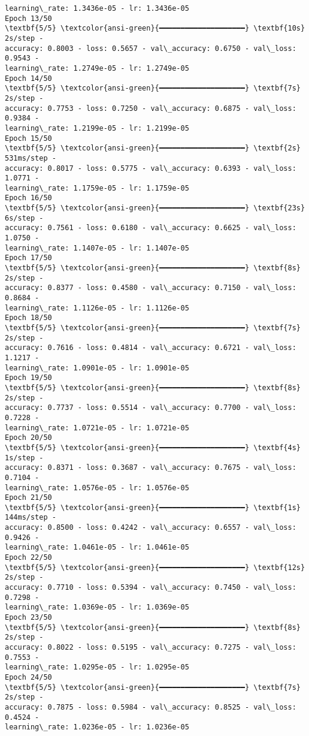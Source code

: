 \documentclass[11pt]{article}
\begin{document}
\begin{Verbatim}[commandchars=\\\{\}]
learning\_rate: 1.3436e-05 - lr: 1.3436e-05
Epoch 13/50
\textbf{5/5} \textcolor{ansi-green}{━━━━━━━━━━━━━━━━━━━━} \textbf{10s} 2s/step -
accuracy: 0.8003 - loss: 0.5657 - val\_accuracy: 0.6750 - val\_loss: 0.9543 -
learning\_rate: 1.2749e-05 - lr: 1.2749e-05
Epoch 14/50
\textbf{5/5} \textcolor{ansi-green}{━━━━━━━━━━━━━━━━━━━━} \textbf{7s} 2s/step -
accuracy: 0.7753 - loss: 0.7250 - val\_accuracy: 0.6875 - val\_loss: 0.9384 -
learning\_rate: 1.2199e-05 - lr: 1.2199e-05
Epoch 15/50
\textbf{5/5} \textcolor{ansi-green}{━━━━━━━━━━━━━━━━━━━━} \textbf{2s} 531ms/step -
accuracy: 0.8017 - loss: 0.5775 - val\_accuracy: 0.6393 - val\_loss: 1.0771 -
learning\_rate: 1.1759e-05 - lr: 1.1759e-05
Epoch 16/50
\textbf{5/5} \textcolor{ansi-green}{━━━━━━━━━━━━━━━━━━━━} \textbf{23s} 6s/step -
accuracy: 0.7561 - loss: 0.6180 - val\_accuracy: 0.6625 - val\_loss: 1.0750 -
learning\_rate: 1.1407e-05 - lr: 1.1407e-05
Epoch 17/50
\textbf{5/5} \textcolor{ansi-green}{━━━━━━━━━━━━━━━━━━━━} \textbf{8s} 2s/step -
accuracy: 0.8377 - loss: 0.4580 - val\_accuracy: 0.7150 - val\_loss: 0.8684 -
learning\_rate: 1.1126e-05 - lr: 1.1126e-05
Epoch 18/50
\textbf{5/5} \textcolor{ansi-green}{━━━━━━━━━━━━━━━━━━━━} \textbf{7s} 2s/step -
accuracy: 0.7616 - loss: 0.4814 - val\_accuracy: 0.6721 - val\_loss: 1.1217 -
learning\_rate: 1.0901e-05 - lr: 1.0901e-05
Epoch 19/50
\textbf{5/5} \textcolor{ansi-green}{━━━━━━━━━━━━━━━━━━━━} \textbf{8s} 2s/step -
accuracy: 0.7737 - loss: 0.5514 - val\_accuracy: 0.7700 - val\_loss: 0.7228 -
learning\_rate: 1.0721e-05 - lr: 1.0721e-05
Epoch 20/50
\textbf{5/5} \textcolor{ansi-green}{━━━━━━━━━━━━━━━━━━━━} \textbf{4s} 1s/step -
accuracy: 0.8371 - loss: 0.3687 - val\_accuracy: 0.7675 - val\_loss: 0.7104 -
learning\_rate: 1.0576e-05 - lr: 1.0576e-05
Epoch 21/50
\textbf{5/5} \textcolor{ansi-green}{━━━━━━━━━━━━━━━━━━━━} \textbf{1s} 144ms/step -
accuracy: 0.8500 - loss: 0.4242 - val\_accuracy: 0.6557 - val\_loss: 0.9426 -
learning\_rate: 1.0461e-05 - lr: 1.0461e-05
Epoch 22/50
\textbf{5/5} \textcolor{ansi-green}{━━━━━━━━━━━━━━━━━━━━} \textbf{12s} 2s/step -
accuracy: 0.7710 - loss: 0.5394 - val\_accuracy: 0.7450 - val\_loss: 0.7298 -
learning\_rate: 1.0369e-05 - lr: 1.0369e-05
Epoch 23/50
\textbf{5/5} \textcolor{ansi-green}{━━━━━━━━━━━━━━━━━━━━} \textbf{8s} 2s/step -
accuracy: 0.8022 - loss: 0.5195 - val\_accuracy: 0.7275 - val\_loss: 0.7553 -
learning\_rate: 1.0295e-05 - lr: 1.0295e-05
Epoch 24/50
\textbf{5/5} \textcolor{ansi-green}{━━━━━━━━━━━━━━━━━━━━} \textbf{7s} 2s/step -
accuracy: 0.7875 - loss: 0.5984 - val\_accuracy: 0.8525 - val\_loss: 0.4524 -
learning\_rate: 1.0236e-05 - lr: 1.0236e-05

\end{Verbatim}
\end{document}
